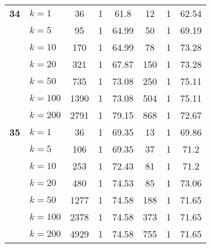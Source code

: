 \begin{table}[htbp]
\begin{tabular}{|l|l|c|c|c|c|c|c|}
    \multicolumn{1}{|r|}{\textbf{34}} & $k=1$ & 36 & 1 & 61.8 & 12 & 1 & 62.54 \\ 
     & $k=5$ & 95 & 1 & 64.99 & 50 & 1 & 69.19 \\ 
     & $k=10$ & 170 & 1 & 64.99 & 78 & 1 & 73.28 \\ 
     & $k=20$ & 321 & 1 & 67.87 & 150 & 1 & 73.28 \\ 
     & $k=50$ & 735 & 1 & 73.08 & 250 & 1 & 75.11 \\ 
     & $k=100$ & 1390 & 1 & 73.08 & 504 & 1 & 75.11 \\ 
     & $k=200$ & 2791 & 1 & 79.15 & 868 & 1 & 72.67 \\ \hline
    \multicolumn{1}{|r|}{\textbf{35}} & $k=1$ & 36 & 1 & 69.35 & 13 & 1 & 69.86 \\ 
     & $k=5$ & 106 & 1 & 69.35 & 37 & 1 & 71.2 \\ 
     & $k=10$ & 253 & 1 & 72.43 & 81 & 1 & 71.2 \\ 
     & $k=20$ & 480 & 1 & 74.53 & 85 & 1 & 73.06 \\ 
     & $k=50$ & 1277 & 1 & 74.58 & 188 & 1 & 71.65 \\ 
     & $k=100$ & 2378 & 1 & 74.58 & 373 & 1 & 71.65 \\ 
     & $k=200$ & 4929 & 1 & 74.58 & 755 & 1 & 71.65 \\ \hline
    \end{tabular}
\end{table}
